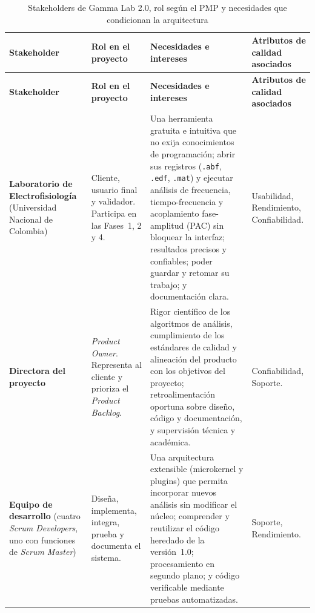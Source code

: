 \documentclass[11pt,a4paper]{article}
\DeclareRobustCommand{\_}{\textunderscore\allowbreak}
\begin{document}
\begin{longtable}{@{}>{\raggedright\arraybackslash}p{3.3cm}
                  >{\raggedright\arraybackslash}p{2.7cm}
                  >{\raggedright\arraybackslash}p{5.7cm}
                  >{\raggedright\arraybackslash}p{3.0cm}@{}}

\caption{Stakeholders de Gamma Lab 2.0, rol según el PMP y necesidades que condicionan la arquitectura} \label{tab:stakeholders} \\
\toprule
\textbf{Stakeholder} &
\textbf{Rol en el proyecto} &
\textbf{Necesidades e intereses} &
\textbf{Atributos de calidad asociados} \\
\midrule
\endfirsthead

\toprule
\textbf{Stakeholder} &
\textbf{Rol en el proyecto} &
\textbf{Necesidades e intereses} &
\textbf{Atributos de calidad asociados} \\
\midrule
\endhead

\bottomrule
\endlastfoot

\textbf{Laboratorio de Electrofisiología} (Universidad Nacional de Colombia)
&
Cliente, usuario final y validador. Participa en las Fases~1, 2 y 4.
&
Una herramienta gratuita e intuitiva que no exija conocimientos de programación; abrir sus registros (\texttt{.abf}, \texttt{.edf}, \texttt{.mat}) y ejecutar análisis de frecuencia, tiempo-frecuencia y acoplamiento fase-amplitud (PAC) sin bloquear la interfaz; resultados precisos y confiables; poder guardar y retomar su trabajo; y documentación clara.
&
Usabilidad, Rendimiento, Confiabilidad.
\\[0.3cm]

\textbf{Directora del proyecto}
&
\textit{Product Owner}. Representa al cliente y prioriza el \textit{Product Backlog}.
&
Rigor científico de los algoritmos de análisis, cumplimiento de los estándares de calidad y alineación del producto con los objetivos del proyecto; retroalimentación oportuna sobre diseño, código y documentación, y supervisión técnica y académica.
&
Confiabilidad, Soporte.
\\[0.3cm]

\textbf{Equipo de desarrollo} (cuatro \textit{Scrum Developers}, uno con funciones de \textit{Scrum Master})
&
Diseña, implementa, integra, prueba y documenta el sistema.
&
Una arquitectura extensible (microkernel y plugins) que permita incorporar nuevos análisis sin modificar el núcleo; comprender y reutilizar el código heredado de la versión~1.0; procesamiento en segundo plano; y código verificable mediante pruebas automatizadas.
&
Soporte, Rendimiento.
\\[0.3cm]


\end{longtable}
\end{document}
